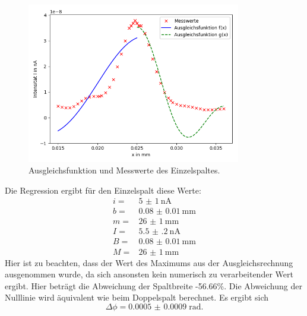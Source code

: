 
\begin{figure}
  \centering
  \includegraphics[height=7cm]{Figure_4.png}
  \caption{Ausgleichsfunktion und Messwerte des Einzelspaltes.}
  \label{fig:plot3}
\end{figure}

Die Regression ergibt für den Einzelspalt diese Werte:
\begin{align*}
  i =& \SI{5(1)}{\nA}\\
  b =& \SI{0.08(1)}{\mm}\\
  m =& \SI{26(1)}{\mm}\\
  I =& \SI{5.5(2)}{\nA}\\
  B =& \SI{0.08(1)}{\mm}\\
  M =& \SI{26(1)}{\mm}
\end{align*}
Hier ist zu beachten, dass der Wert des Maximums aus der Ausgleichsrechnung ausgenommen
wurde, da sich ansonsten kein numerisch zu verarbeitender Wert ergibt.
Hier beträgt die Abweichung der Spaltbreite -56.66\%.
Die Abweichung der Nulllinie wird äquivalent wie beim Doppelspalt berechnet.
Es ergibt sich
\begin{equation*}
  \Delta \phi= \SI{0.0005(9)}\; \text{rad}.
\end{equation*}
